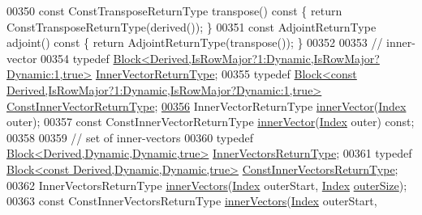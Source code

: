\begin{DoxyCode}
00350     \textcolor{keyword}{const} ConstTransposeReturnType transpose()\textcolor{keyword}{ const }\{ \textcolor{keywordflow}{return} ConstTransposeReturnType(derived()); \}
00351     \textcolor{keyword}{const} AdjointReturnType adjoint()\textcolor{keyword}{ const }\{ \textcolor{keywordflow}{return} AdjointReturnType(transpose()); \}
00352 
00353     \textcolor{comment}{// inner-vector}
00354     \textcolor{keyword}{typedef} \hyperlink{group___core___module_class_eigen_1_1_block}{Block<Derived,IsRowMajor?1:Dynamic,IsRowMajor?Dynamic:1,true>}
             \hyperlink{group___core___module_class_eigen_1_1_block}{InnerVectorReturnType};
00355     \textcolor{keyword}{typedef} \hyperlink{group___core___module_class_eigen_1_1_block}{Block<const Derived,IsRowMajor?1:Dynamic,IsRowMajor?Dynamic:1,true>}
       \hyperlink{group___core___module_class_eigen_1_1_block}{ConstInnerVectorReturnType};
\hyperlink{group___sparse_core___module_aa56c62b99e26e37c5f93ea83e0c3ba58}{00356}     InnerVectorReturnType \hyperlink{group___sparse_core___module_a65aaf3b50d205011e2bfa0de24756cce}{innerVector}(\hyperlink{group___core___module_a554f30542cc2316add4b1ea0a492ff02}{Index} outer);
00357     \textcolor{keyword}{const} ConstInnerVectorReturnType \hyperlink{group___sparse_core___module_a65aaf3b50d205011e2bfa0de24756cce}{innerVector}(\hyperlink{group___core___module_a554f30542cc2316add4b1ea0a492ff02}{Index} outer) \textcolor{keyword}{const};
00358 
00359     \textcolor{comment}{// set of inner-vectors}
00360     \textcolor{keyword}{typedef} \hyperlink{group___core___module_class_eigen_1_1_block}{Block<Derived,Dynamic,Dynamic,true>} 
      \hyperlink{group___core___module_class_eigen_1_1_block}{InnerVectorsReturnType};
00361     \textcolor{keyword}{typedef} \hyperlink{group___core___module_class_eigen_1_1_block}{Block<const Derived,Dynamic,Dynamic,true>} 
      \hyperlink{group___core___module_class_eigen_1_1_block}{ConstInnerVectorsReturnType};
00362     InnerVectorsReturnType \hyperlink{group___sparse_core___module_a3c51bf5a7eb18eab9a85949d03aed14a}{innerVectors}(\hyperlink{group___core___module_a554f30542cc2316add4b1ea0a492ff02}{Index} outerStart, \hyperlink{group___core___module_a554f30542cc2316add4b1ea0a492ff02}{Index} 
      \hyperlink{group___sparse_core___module_ac86cc88a4cfef21db6b64ec0ab4c8f0a}{outerSize});
00363     \textcolor{keyword}{const} ConstInnerVectorsReturnType \hyperlink{group___sparse_core___module_a3c51bf5a7eb18eab9a85949d03aed14a}{innerVectors}(\hyperlink{group___core___module_a554f30542cc2316add4b1ea0a492ff02}{Index} outerStart, 

\end{DoxyCode}
